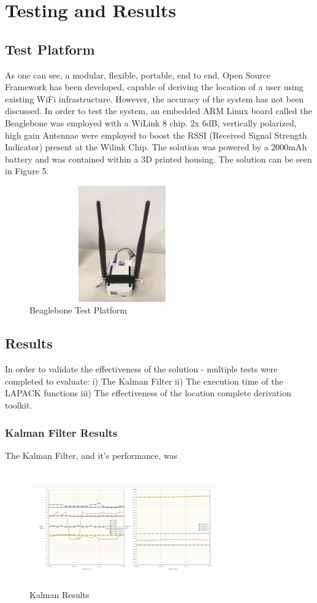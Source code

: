 \documentclass[conference]{IEEEtran}
\begin{document}
\section{Testing and Results}
\subsection{Test Platform}
As one can see, a modular, flexible, portable, end to end, Open Source Framework has been developed, capable of deriving the location of a user using existing WiFi infrastructure. However, the accuracy of the system has not been discussed. In order to test the system, an embedded ARM Linux board called the Beaglebone was employed with a WiLink 8 chip. 2x 6dB, vertically polarized, high gain Antennae were employed to boost the RSSI (Received Signal Strength Indicator) present at the Wilink Chip. The solution was powered by a 2000mAh battery and was contained within a 3D printed housing. The solution can be seen in Figure 5.
\begin{figure}[H]
    \includegraphics[width=8cm,height=5cm]{IMG_0796.JPG}
    \caption{Beaglebone Test Platform}
    \end{figure}

\subsection{Results}
In order to validate the effectiveness of the solution - multiple tests were completed to evaluate:\newline
i) The Kalman Filter \newline
ii) The execution time of the LAPACK functions\newline
iii) The effectiveness of the location complete derivation toolkit.

\subsubsection{Kalman Filter Results}
The Kalman Filter, and it's performance, was
\begin{figure}[H]
    \includegraphics[width=8cm,height=5cm]{2018-05-10-PHOTO-00000079.png}
    \caption{Kalman Results}
    \end{figure}
\end{document}

